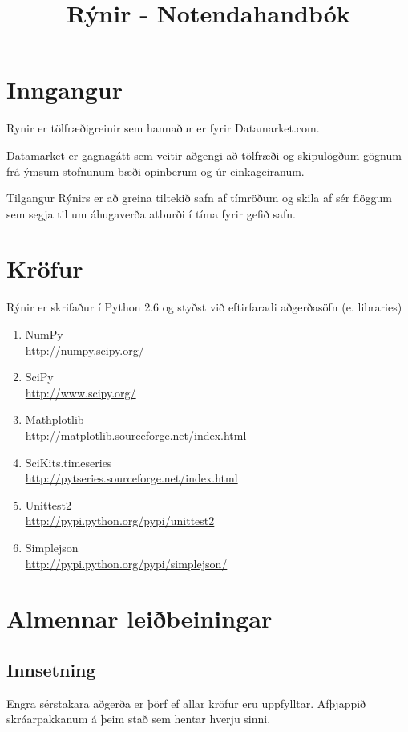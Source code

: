\documentclass[11pt]{article}
\title{Rýnir - Notendahandbók}
\date{}
\begin{document}
\maketitle

\section{Inngangur}
Rynir er tölfræðigreinir sem hannaður er fyrir Datamarket.com.

Datamarket er gagnagátt sem veitir aðgengi að tölfræði og skipulögðum gögnum frá ýmsum stofnunum bæði opinberum og úr einkageiranum.

Tilgangur Rýnirs er að greina tiltekið safn af tímröðum og skila af sér flöggum sem segja til um áhugaverða atburði í tíma fyrir gefið safn.
 
\section{Kröfur}
Rýnir er skrifaður í Python 2.6 og styðst við eftirfaradi aðgerðasöfn (e. libraries)\\
\renewcommand{\theenumi}{\roman{enumi}}
\renewcommand{\labelenumi}{\theenumi}
\begin{enumerate}
 \item NumPy\\ \url{http://numpy.scipy.org/}
 \item SciPy\\ \url{http://www.scipy.org/}
 \item Mathplotlib\\ \url{http://matplotlib.sourceforge.net/index.html}
 \item SciKits.timeseries\\ \url{http://pytseries.sourceforge.net/index.html}
 \item Unittest2\\ \url{http://pypi.python.org/pypi/unittest2}
 \item Simplejson\\ \url{http://pypi.python.org/pypi/simplejson/}
\end{enumerate}

\section{Almennar leiðbeiningar}


\subsection{Innsetning}
Engra sérstakara aðgerða er þörf ef allar kröfur eru uppfylltar. Afþjappið skráarpakkanum á þeim stað sem hentar hverju sinni.
\end{document}
